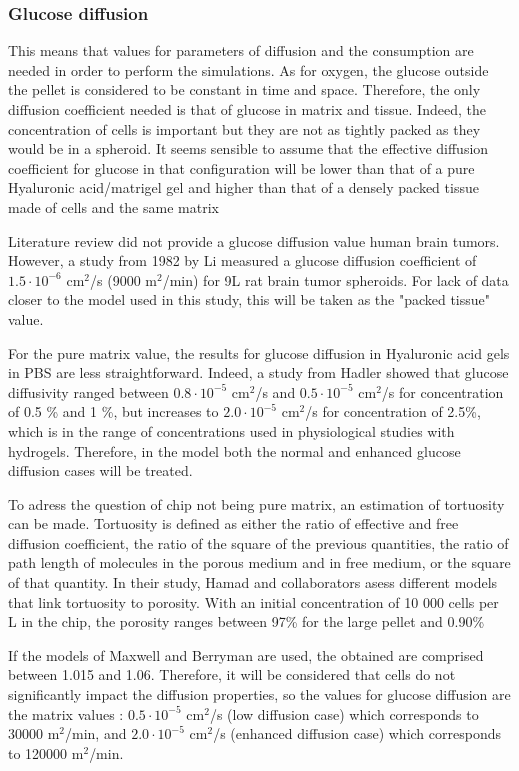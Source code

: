 \documentclass[11pt,a4paper]{article}
\begin{document}
\subsubsection{Glucose diffusion}
This means that values for parameters of diffusion and the consumption are needed in order to perform the simulations. As for oxygen, the glucose outside the pellet is considered to be constant in time and space. Therefore, the only diffusion coefficient needed is that of glucose in matrix and tissue. Indeed, the concentration of cells is important but they are not as tightly packed as they would be in a spheroid. It seems sensible to assume that the effective diffusion coefficient for glucose in that configuration will be lower than that of a pure Hyaluronic acid/matrigel gel and higher than that of a densely packed tissue made of cells and the same matrix

Literature review did not provide a glucose diffusion value human brain tumors. However, a study from 1982  by Li measured a glucose diffusion coefficient of $1.5\cdot 10^{-6}$ cm$^2$/s (9000 \textmu m$^2$/min) for 9L rat brain tumor spheroids.\cite{Li1982} For lack of data closer to the model used in this study, this will be taken as the "packed tissue" value. 

For the pure matrix value, the results for glucose diffusion in Hyaluronic acid gels in PBS are less straightforward. Indeed, a study from Hadler showed that glucose diffusivity ranged between $0.8\cdot 10^{-5}$ cm$^2$/s and $0.5\cdot 10^{-5}$ cm$^2$/s for concentration of 0.5 \% and 1 \%, but increases to $2.0\cdot 10^{-5}$ cm$^2$/s for concentration of 2.5\%, which is in the range of concentrations used in physiological studies with hydrogels.\cite{Gerecht2007} Therefore, in the model both the normal and enhanced glucose diffusion cases will be treated.

To adress the question of chip not being pure matrix, an estimation of tortuosity can be made. Tortuosity is defined as either the ratio of effective and free diffusion coefficient, the ratio of the square of the previous quantities, the ratio of path length of molecules in the porous medium and in free medium, or the square of that quantity. In their study, Hamad and collaborators asess different models that link tortuosity to porosity.\cite{Hamad2018} With an initial concentration of 10 000 cells per \textmu L in the chip, the porosity ranges between 97\% for the large pellet and 0.90\% 

If the models of Maxwell and Berryman are used, the obtained  are comprised between 1.015 and 1.06. Therefore, it will be considered that cells do not significantly impact the diffusion properties, so the values for glucose diffusion are the matrix values : $0.5\cdot 10^{-5}$ cm$^2$/s (low diffusion case) which corresponds to 30000 \textmu m$^2$/min, and $2.0\cdot 10^{-5}$ cm$^2$/s (enhanced diffusion case) which corresponds to 120000 \textmu m$^2$/min.
\end{document}
